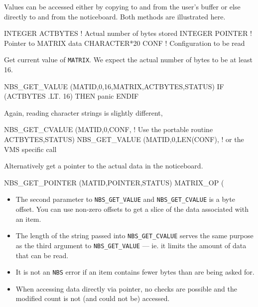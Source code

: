 \documentclass[twoside,11pt,nolof]{starlink}
\begin{document}
Values can be accessed either by copying to and from the user's buffer or else
directly to and from the noticeboard. Both methods are illustrated here.

\begin{terminalv}
INTEGER   ACTBYTES                ! Actual number of bytes stored
INTEGER   POINTER                 ! Pointer to MATRIX data
CHARACTER*20  CONF                ! Configuration to be read
\end{terminalv}

Get current value of \texttt{MATRIX}. We expect the actual number of bytes to
be at least 16.

\begin{terminalv}
NBS_GET_VALUE (MATID,0,16,MATRIX,ACTBYTES,STATUS)
IF (ACTBYTES .LT. 16) THEN
  panic
ENDIF
\end{terminalv}

Again, reading character strings is slightly different,

\begin{terminalv}
NBS_GET_CVALUE (MATID,0,CONF,     ! Use the portable routine
              ACTBYTES,STATUS)
NBS_GET_VALUE (MATID,0,LEN(CONF), ! or the VMS specific call
\end{terminalv}

Alternatively get a pointer to the actual data in the noticeboard.

\begin{terminalv}
NBS_GET_POINTER (MATID,POINTER,STATUS)
MATRIX_OP       (%
\end{terminalv}

\begin {itemize}
\item The second parameter to \texttt{NBS\_GET\_VALUE} and \texttt{NBS\_GET\_CVALUE}
is a byte offset. You can use non-zero offsets to get a slice of the
data associated with an item.
\item The length of the string passed into \texttt{NBS\_GET\_CVALUE} serves
the same purpose as the third argument to \texttt{NBS\_GET\_VALUE} --- ie. it
limits the amount of data that can be read.
\item It is not an \texttt{NBS} error if an item contains fewer bytes than are
being asked for.
\item When accessing data directly via pointer, no checks are possible and the
modified count is not (and could not be) accessed.
\end {itemize}
\end{document}
